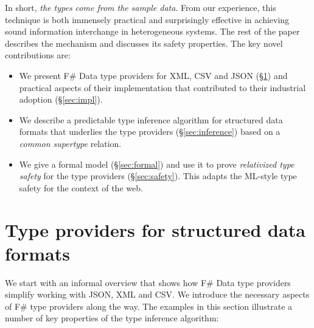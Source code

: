 \documentclass[10pt,preprint,blind,clearpagebib]{sigplanconf}
\begin{document}
In short, \emph{the types come from the sample data}.  From our experience, 
this technique is both immensely practical and surprisingly effective in achieving sound 
information interchange in heterogeneous systems.
The rest of the paper describes the mechanism and discusses its safety properties. 
The key novel contributions are:

\begin{itemize}
\item We present F\# Data type providers for XML, CSV and JSON (\S\ref{sec:providers}) 
  and practical aspects of their implementation that contributed to their industrial 
  adoption (\S\ref{sec:impl}). 

\item We describe a predictable type inference algorithm for structured data formats that
  underlies the type providers (\S\ref{sec:inference}) based on a \emph{common supertype}
  relation.

\item We give a formal model (\S\ref{sec:formal}) and use it to prove
  \emph{relativized type safety} for the type providers (\S\ref{sec:safety}).
  This adapts the ML-style type safety for the context of the web.
\end{itemize}



%
%

\section{Type providers for structured data formats}
\label{sec:providers}

We start with an informal overview that shows how F\# Data type providers simplify working with 
JSON, XML and CSV. We introduce the necessary aspects of F\# type providers along the 
way. The examples in this section illustrate a number of key properties of the type inference 
algorithm:
\end{document}
